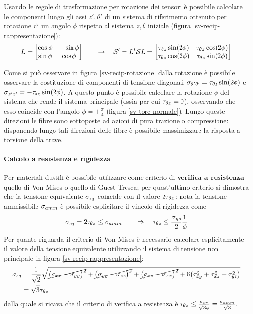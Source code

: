     	Usando le regole di trasformazione per rotazione dei tensori è possibile calcolare le componenti lungo gli assi $z',\theta'$ di un sistema di riferimento ottenuto per rotazione di un angolo $\phi$ rispetto al sistema $z,\theta$ iniziale (figura \ref{sv-recip-rappresentazione}):
    	\[ L = \begin{bmatrix}
    		\cos\phi & -\sin\phi \\ \sin\phi & \cos\phi
    	\end{bmatrix} \qquad \rightarrow \quad \mathcal S' = L^t \mathcal S L = \begin{bmatrix}
    		\tau_{\theta z} \sin(2\phi) & \tau_{\theta z} \cos(2\phi) \\ \tau_{\theta z} \cos(2\phi) & \tau_{\theta z} \sin(2\phi)
    	\end{bmatrix}\]
    	
    	Come si può osservare in figura \ref{sv-recip-rotazione} dalla rotazione è possibile osservare la costituzione di componenti di tensione diagonali $\sigma_{\theta'\theta'} = \tau_{\theta z} \sin(2\phi)$ e $\sigma_{z'z'} = - \tau_{\theta z} \sin(2\phi)$. A questo punto è possibile calcolare la rotazione $\phi$ del sistema che rende il sistema principale (ossia per cui $\tau_{\theta z} = 0$), osservando che esso coincide con l'angolo $\phi = \pm \frac \pi 4$ (figura \ref{sv-torc-normale}). Lungo queste direzioni le fibre sono sottoposte ad azioni di pura trazione o compressione: disponendo lungo tali direzioni delle fibre è possibile massimizzare la risposta a torsione della trave.
    	
    	
    	
    	\paragraph{Calcolo a resistenza e rigidezza} Per materiali duttili è possibile utilizzare come criterio di \textbf{verifica a resistenza} quello di Von Mises o quello di Guest-Tresca; per quest'ultimo criterio si dimostra che la tensione equivalente $\sigma_{eq}$ coincide con il valore $2\tau_{\theta z}$: nota la tensione ammissibile $\sigma_{amm}$ è possibile esplicitare il vincolo di rigidezza come
    	\[ \sigma_{eq} = 2\tau_{\theta z} \leq \sigma_{amm} \qquad \Rightarrow \quad \tau_{\theta z} \leq \frac{\sigma_{ys}}{2} \frac 1 \phi\]
    	Per quanto riguarda il criterio di Von Mises è necessario calcolare esplicitamente il valore della tensione equivalente utilizzando il sistema di tensione non principale in figura \ref{sv-recip-rappresentazione}:
    	\begin{align*}
    		\sigma_{eq} & = \frac 1 {\sqrt 2} \sqrt{ \cancel{\big(\sigma_{xx} - \sigma_{yy}\big)^2} + \cancel{\big(\sigma_{yy} - \sigma_{zz}\big)^2} + \cancel{\big(\sigma_{zz} - \sigma_{xx}\big)^2} + 6\big( \tau_{xy}^2 + \tau_{xz}^2+ \tau_{yz}^2 \big)  } \\ & = \sqrt 3\tau_{\theta z}
    	\end{align*}
    	dalla quale si ricava che il criterio di verifica a resistenza è $\tau_{\theta z} \leq \frac {\sigma_{cr}} {\sqrt 3 \phi} = \frac {\sigma_{amm}}{\sqrt 3}$.
    	
    	
    	
    	
    	
    	
    	
    	
    	
    	
    	
    	
    	
    	
    	
    